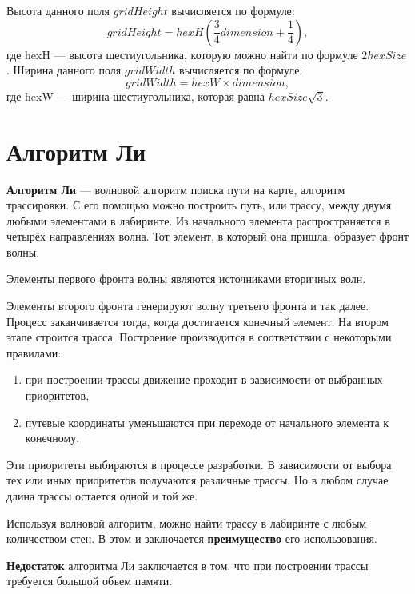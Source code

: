 Высота данного поля $gridHeight$ вычисляется по формуле: 
\begin{equation}
\label{hexGrid:gridHeight}
	gridHeight=hexH(\frac{3}{4}dimension+\frac{1}{4}),
\end{equation} 
где hexH --- высота шестиугольника, которую можно найти по формуле $2hexSize$. 
Ширина данного поля $gridWidth$ вычисляется по формуле: 
\begin{equation}
\label{hexGrid:gridWidth}
gridWidth=hexW\times dimension, 
\end{equation}
где hexW --- ширина 
шестиугольника, которая равна $hexSize\sqrt{3}$.

\section{Алгоритм Ли}
\label{analysis:li}

 \textbf{Алгоритм Ли} — волновой алгоритм поиска пути на карте, алгоритм трассировки. С его помощью можно построить путь, или трассу, между двумя любыми элементами в лабиринте. Из начального элемента распространяется в четырёх направлениях волна. Тот элемент, в который она пришла, образует фронт волны.

Элементы первого фронта волны являются источниками вторичных волн.

Элементы второго фронта генерируют волну третьего фронта и так далее. Процесс заканчивается тогда, когда достигается конечный элемент. На втором этапе строится трасса. Построение производится в соответствии с некоторыми правилами:
\begin{enumerate}

\item при построении трассы движение проходит в зависимости от выбранных приоритетов,
\item путевые координаты уменьшаются при переходе от начального элемента к конечному.
\end{enumerate}
Эти приоритеты выбираются в процессе разработки. В зависимости от выбора тех или иных приоритетов получаются различные трассы. Но в любом случае длина трассы остается одной и той же.

Используя волновой алгоритм, можно найти трассу в лабиринте с любым количеством стен. В этом и заключается \textbf{преимущество} его использования.

\textbf{Недостаток} алгоритма Ли заключается в том, что при построении трассы требуется большой объем памяти.






































